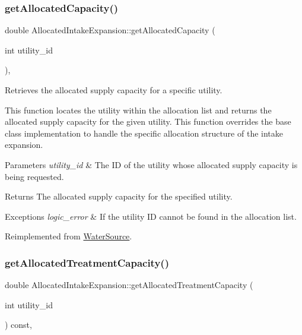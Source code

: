 \subsubsection{\texorpdfstring{get\+Allocated\+Capacity()}{getAllocatedCapacity()}}
{\footnotesize\ttfamily double Allocated\+Intake\+Expansion\+::get\+Allocated\+Capacity (\begin{DoxyParamCaption}\item[{int}]{utility\+\_\+id }\end{DoxyParamCaption})\hspace{0.3cm}{\ttfamily [override]}, {\ttfamily [virtual]}}



Retrieves the allocated supply capacity for a specific utility. 

This function locates the utility within the allocation list and returns the allocated supply capacity for the given utility. This function overrides the base class implementation to handle the specific allocation structure of the intake expansion.


\begin{DoxyParams}{Parameters}
{\em utility\+\_\+id} & The ID of the utility whose allocated supply capacity is being requested.\\
\hline
\end{DoxyParams}
\begin{DoxyReturn}{Returns}
The allocated supply capacity for the specified utility.
\end{DoxyReturn}

\begin{DoxyExceptions}{Exceptions}
{\em logic\+\_\+error} & If the utility ID cannot be found in the allocation list. \\
\hline
\end{DoxyExceptions}


Reimplemented from \mbox{\hyperlink{classWaterSource_ad218f2a603d7ebce268d800e0249a74c}{Water\+Source}}.

\mbox{\label{classAllocatedIntakeExpansion_a20fb863c5e0bce30c10d1791b037a57a}} 
\subsubsection{\texorpdfstring{get\+Allocated\+Treatment\+Capacity()}{getAllocatedTreatmentCapacity()}}
{\footnotesize\ttfamily double Allocated\+Intake\+Expansion\+::get\+Allocated\+Treatment\+Capacity (\begin{DoxyParamCaption}\item[{int}]{utility\+\_\+id }\end{DoxyParamCaption}) const\hspace{0.3cm}{\ttfamily [override]}, {\ttfamily [virtual]}}



